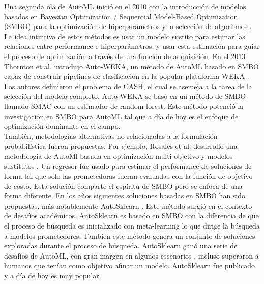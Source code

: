 Una segunda ola de AutoML inició en el 2010 con la introducción de modelos basados en Bayesian Optimization / Sequential Model-Based Optimization (SMBO) para la optimización de hiperparámetros y la selección de algoritmos \parencite{8} \parencite{3}. La idea intuitiva de estos métodos es usar un modelo sustito para estimar las relaciones entre performance e hiperparámetros, y usar esta estimación para guiar el proceso de optimización a través de una función de adquisición. En el 2013 Thornton et al. introdujo Auto-WEKA, un método de AutoML basado en SMBO capaz de construir pipelines de clasificación en la popular plataforma WEKA \parencite{4}. Los autores definieron el problema de CASH, el cual se asemeja a la tarea de la selección del modelo completo. Auto-WEKA se basó en un método de SMBO llamado SMAC \parencite{3} con un estimador de random forest. Este método potenció la investigación en SMBO para AutoML tal que a día de hoy es el enfoque de optimización dominante en el campo. \\

También, metodologías alternativas no relacionadas a la formulación probabilística fueron propuestas. Por ejemplo, Rosales et al. desarrolló una metodología de AutoMl basada en optimización multi-objetivo y modelos sustitutos \parencite{5}. Un regresor fue usado para estimar el performance de soluciones de forma tal que solo las prometedoras fueran evaluadas con la función de objetivo de costo. Esta solución comparte el espíritu de SMBO pero se enfoca de una forma diferente. En los años siguientes soluciones basadas en SMBO han sido propuestas, más notablemente AutoSklearn \parencite{6}. Este método surgió en el contexto de desafíos académicos. AutoSklearn es basado en SMBO con la diferencia de que el proceso de búsqueda es inicializado con meta-learning lo que dirige la búsqueda a modelos prometedores. También este método genera un conjunto de soluciones exploradas durante el proceso de búsqueda. AutoSklearn ganó una serie de desafíos de AutoML, con gran margen en algunos escenarios \parencite{7}, incluso superaron a humanos que tenían como objetivo afinar un modelo. AutoSklearn fue publicado y a día de hoy es muy popular. \\

